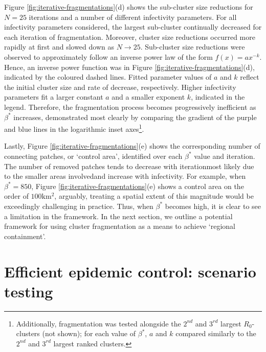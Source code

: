 Figure \ref{fig:iterative-fragmentations}(d) shows the sub-cluster size reductions for $N=25$ iterations and a number of different infectivity parameters.
For all infectivity parameters considered, the largest sub-cluster continually decreased for each iteration of fragmentation.
Moreover, cluster size reductions occurred more rapidly at first and slowed down as $N\rightarrow 25$.
Sub-cluster size reductions were observed to approximately follow an inverse power law of the form $f(x) = ax^{-k}$. Hence, an inverse power function was in Figure \ref{fig:iterative-fragmentations}(d), indicated by the coloured dashed lines. Fitted parameter values of $a$ and $k$ reflect the initial cluster size and rate of decrease, respectively. Higher infectivity parameters fit a larger constant $a$ and a smaller exponent $k$, indicated in the legend. Therefore, the fragmentation process becomes progressively inefficient as $\beta^*$ increases,
demonstrated most clearly by comparing the gradient of the purple and blue lines in the logarithmic inset axes\footnote{ Additionally, fragmentation was tested alongside the $2^{nd}$ and $3^{rd}$ largest $R_0$-clusters (not shown); for each value of $\beta^*$, $a$ and $k$ compared similarly to the $2^{nd}$ and $3^{rd}$ largest ranked clusters.}.

Lastly, Figure \ref{fig:iterative-fragmentations}(e) shows the corresponding number of connecting patches, or `control area', identified over each $\beta^*$ value and iteration.
The number of removed patches tends to decrease with iteration\textemdash most likely due to the smaller areas involved\textemdash and increase with infectivity.
For example, when $\beta^*=850$, Figure \ref{fig:iterative-fragmentations}(e) shows a control area on the order of $100\mathrm{km^2}$,
arguably, treating a spatial extent of this magnitude would be exceedingly challenging in practice.
Thus, when $\beta^*$ becomes high, it is clear to see a limitation in the framework.
In the next section, we outline a potential framework for using cluster fragmentation as a means to achieve `regional containment'.

\section{Efficient epidemic control: scenario testing}
\label{sec:towards-regional-control}

